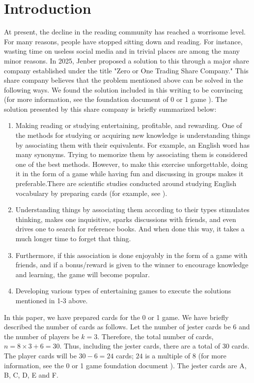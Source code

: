 \documentclass[a4paper,12pt]{article}
\theoremstyle{mystyle}
\numberwithin{equation}{section}
\numberwithin{theorem}{section}
\numberwithin{proposition}{section}
\numberwithin{example}{section}
\numberwithin{remark}{section}
\numberwithin{lemma}{section}
\numberwithin{corollary}{section}
\numberwithin{definition}{section}
\begin{document}
\section{Introduction}
\label{S:2}
At present, the decline in the reading community has reached a worrisome level. For many reasons, people have stopped sitting down and reading. For instance, wasting time on useless social media and in trivial places are among the many minor reasons. In 2025, Jenber proposed a solution to this through a major share company established under the title "Zero or One Trading Share Company." This share company believes that the problem mentioned above can be solved in the following ways. We found the solution included in this writing to be convincing (for more information, see the foundation document of 0 or 1 game \cite{ZOOTSC}). The solution presented by this share company is briefly summarized below:
\begin{enumerate}\item[(1)] Making reading or studying entertaining, profitable, and rewarding. One of the methods for studying or acquiring new knowledge is understanding things by associating them with their equivalents. For example, an English word has many synonyms. Trying to memorize them by associating them is considered one of the best methods. However, to make this exercise unforgettable, doing it in the form of a game while having fun and discussing in groups makes it preferable.There are scientific studies conducted around studying English vocabulary by preparing cards (for example, see \cite{aslan2011teaching,azabdaftari2012comparing,bryson2012using,kosim2013improving,nikoopour2014vocabulary,nugroho2012improving,saputri2017improving,senzaki2017reinventing,sitompul2013teaching,wahyuni2014flashcards}).
\item[(2)] Understanding things by associating them according to their types stimulates thinking, makes one inquisitive, sparks discussions with friends, and even drives one to search for reference books. And when done this way, it takes a much longer time to forget that thing.
\item[(3)] Furthermore, if this association is done enjoyably in the form of a game with friends, and if a bonus/reward is given to the winner to encourage knowledge and learning, the game will become popular.
\item[(4)] Developing various types of entertaining games to execute the solutions mentioned in 1-3 above.
\end{enumerate}
In this paper, we have prepared cards for the 0 or 1 game. We have briefly described the number of cards as follows. Let the number of jester cards be $6$ and the number of players be $k = 3$. Therefore, the total number of cards, $n = 8 \times 3 + 6 = 30$. Thus, including the jester cards, there are a total of $30$ cards. The player cards will be $30 - 6 = 24$ cards; $24$ is a multiple of $8$ (for more information, see the 0 or 1 game foundation document \cite{ZOOTSC}). The jester cards are A, B, C, D, E and F.
\end{document}
